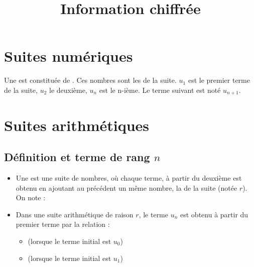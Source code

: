 \documentclass[12pt,a4paper]{article}
\date{}
\title{Information chiffrée }
\begin{document}




\section{Suites numériques}

\begin{mydef}
	Une  est constituée de . Ces nombres sont les  de la suite. $u_1$ est le premier terme de la suite, $u_2$ le deuxième, $u_n$ est le n-ième. Le terme suivant est noté $u_{n+1}$.\\
\end{mydef}

\section{Suites arithmétiques}

\subsection{Définition et terme de rang $n$}



\begin{mybilan}
	\begin{itemize}
		
		\item Une  est une suite de nombres, où chaque terme, à partir du deuxième est obtenu en ajoutant au précédent un même nombre, la  de la suite (notée $r$).	
		On note :
			
			
			
		\item Dans une suite arithmétique de raison $r$, le terme $u_n$ est obtenu à partir du premier terme par la relation :
			\begin{itemize}
				\item {} (lorsque le terme initial est $u_0$) 
				\item {} (lorsque le terme initial est $u_1$)
			\end{itemize}
			

	\end{itemize}	
\end{mybilan}	
\end{document}
